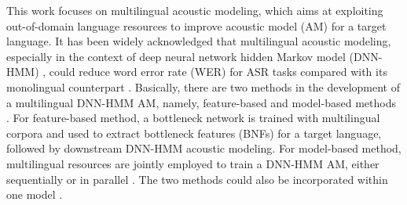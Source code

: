 \documentclass[a4paper]{article}
\begin{document}
This work focuses on multilingual acoustic modeling, which aims at
exploiting out-of-domain language resources to  improve acoustic model (AM) for a target language.
It has been widely acknowledged that multilingual acoustic modeling, especially in the context of deep neural network hidden Markov model (DNN-HMM) \cite{dahl2012context},
could reduce word error rate (WER) for ASR tasks compared with its monolingual counterpart \cite{Huang2013cross,ghoshal2013multilingual,karafiat2016multilingual,Zhou2017}. Basically, there are two methods in the  development of a multilingual DNN-HMM AM, namely, feature-based and model-based methods \cite{karafiat20172016,sercu2017network}.
For feature-based method, a bottleneck network is trained with multilingual corpora and used to  extract bottleneck features (BNFs) for a target language, followed by downstream DNN-HMM acoustic modeling.
For model-based method, multilingual resources are jointly employed to train a DNN-HMM AM, either sequentially \cite{ghoshal2013multilingual} or in parallel \cite{Huang2013cross}. The two methods could also be incorporated within one model \cite{karafiat20172016}.
\end{document}
